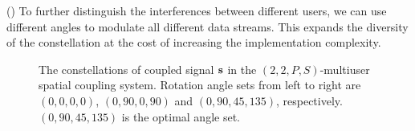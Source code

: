 \documentclass[conference]{IEEEtran}
\begin{document}
(\uppercase\expandafter{}) To further distinguish the interferences between different users, we can use different angles to modulate all different data streams. This expands the diversity of the constellation at the cost of increasing the implementation complexity.
\begin{figure}[h!]
\vspace{-0.8em}
\setlength{\abovecaptionskip}{0.cm}
\setlength{\belowcaptionskip}{-0.cm}
  \caption{The constellations of coupled signal ${\bf{s}}$ in the $(2,2,P,S)$-multiuser spatial coupling system. Rotation angle sets from left to right are $\left( {0,0,0,0} \right)$, $\left( {0,90,0,90} \right)$ and $\left( {0,90,45,135} \right)$, respectively. $\left( {0,90,45,135} \right)$ is the optimal angle set.}\label{fig.4}
    \vspace{-1em}
\end{figure}
\end{document}
